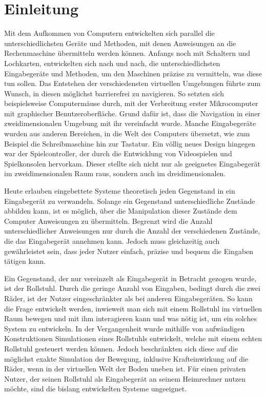 \chapter{Einleitung}
Mit dem Aufkommen von Computern entwickelten sich parallel die unterschiedlichsten Geräte und Methoden, mit denen Anweisungen an die Rechenmaschine übermitteln werden können.
Anfangs noch mit Schaltern und Lochkarten, entwickelten sich nach und nach, die unterschiedlichsten Eingabegeräte und Methoden, um den Maschinen präzise zu vermitteln, was diese tun sollen.
Das Entstehen der verschiedensten virtuellen Umgebungen führte zum Wunsch, in diesen möglichst barrierefrei zu navigieren.
So setzten sich beispielsweise Computermäuse durch, mit der Verbreitung erster Mikrocomputer mit graphischer Benutzeroberfläche.
Grund dafür ist, dass die Navigation in einer zweidimensionalen Umgebung mit ihr vereinfacht wurde.
Manche Eingabegeräte wurden aus anderen Bereichen, in die Welt des Computers übersetzt, wie zum Beispiel die Schreibmaschine hin zur Tastatur.
Ein völlig neues Design hingegen war der Spielcontroller, der durch die Entwicklung von Videospielen und Spielkonsolen hervorkam.
Dieser stellte sich nicht nur als geeignetes Eingabegerät im zweidimensionalen Raum raus, sondern auch im dreidimensionalen.

Heute erlauben eingebettete Systeme theoretisch jeden Gegenstand in ein Eingabegerät zu verwandeln.
Solange ein Gegenstand unterschiedliche Zustände abbilden kann, ist es möglich, über die Manipulation dieser Zustände dem Computer Anweisungen zu übermitteln.
Begrenzt wird die Anzahl unterschiedlicher Anweisungen nur durch die Anzahl der verschiedenen Zustände, die das Eingabegerät annehmen kann.
Jedoch muss gleichzeitig auch gewährleistet sein, dass jeder Nutzer einfach, präzise und bequem die Eingaben tätigen kann.

Ein Gegenstand, der nur vereinzelt als Eingabegerät in Betracht gezogen wurde, ist der Rollstuhl.
Durch die geringe Anzahl von Eingaben, bedingt durch die zwei Räder, ist der Nutzer eingeschränkter als bei anderen Eingabegeräten.
So kann die Frage entwickelt werden, inwieweit man sich mit einem Rollstuhl im virtuellen Raum bewegen und mit ihm interagieren kann und was nötig ist, um ein solches System zu entwickeln.
In der Vergangenheit wurde mithilfe von aufwändigen Konstruktionen Simulationen eines Rollstuhls entwickelt, welche mit einem echten Rollstuhl gesteuert werden können.
Jedoch beschränkten sich diese auf die möglichst exakte Simulation der Bewegung, inklusive Krafteinwirkung auf die Räder, wenn in der virtuellen Welt der Boden uneben ist.
Für einen privaten Nutzer, der seinen Rollstuhl als Eingabegerät an seinem Heimrechner nutzen möchte, sind die bislang entwickelten Systeme ungeeignet.

